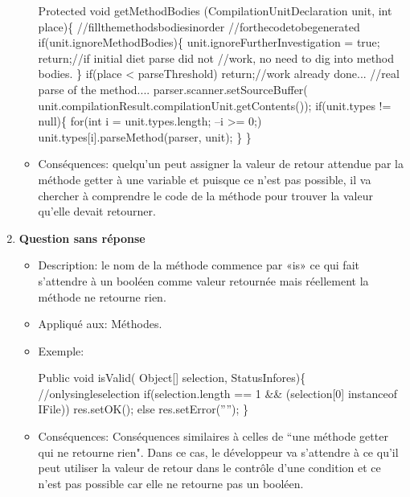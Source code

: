 \begin{enumerate}
\begin{itemize}
\begin{framed}
{\selectfont
Protected void getMethodBodies (CompilationUnitDeclaration unit, int place)\{ \newline
//fillthemethodsbodiesinorder \newline
//forthecodetobegenerated \newline
if(unit.ignoreMethodBodies)\{\newline
unit.ignoreFurtherInvestigation = true;\newline
return;//if initial diet parse did not\newline
//work, no need to dig into method bodies.\newline
\}\newline
if(place < parseThreshold)\newline
return;//work already done...\newline
//real parse of the method....\newline
parser.scanner.setSourceBuffer(\newline
unit.compilationResult.compilationUnit.getContents());\newline
if(unit.types != null)\{\newline
for(int i = unit.types.length; --i >= 0;)\newline
unit.types[i].parseMethod(parser, unit);\newline
\}\newline
\}\newline
}
\end{framed}
\item Conséquences: quelqu’un peut assigner la valeur de retour attendue par la méthode getter à une variable et puisque ce n’est pas possible, il va chercher à comprendre le code de la méthode pour trouver la valeur qu’elle devait retourner.
\end{itemize}

\item \textbf {Question sans réponse}
\begin{itemize}
\item Description: le nom de la méthode commence par «is» ce qui fait s'attendre à un booléen comme valeur retournée mais réellement la méthode ne retourne rien.
\item Appliqué aux: Méthodes.
\item Exemple: 
\begin{framed}

{\selectfont
Public void isValid(
Object[] selection, StatusInfores)\{
//onlysingleselection
if(selection.length == 1 && (selection[0] instanceof IFile))
res.setOK();
else res.setError(””);
\}
}
\end{framed}
\item Conséquences: Conséquences similaires à celles de “une méthode getter qui ne retourne rien". Dans ce cas, le développeur va s’attendre à ce qu’il peut utiliser la valeur de retour dans le contrôle d’une condition et ce n’est pas possible car elle ne retourne pas un booléen.
\end{itemize}


\end{enumerate}
